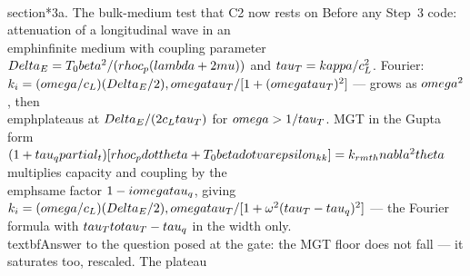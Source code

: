 \documentclass[11pt]{article}
\begin{document}
\\section*{3a. The bulk-medium test that C2 now rests on}
Before any Step~3 code: attenuation of a longitudinal wave in an \\emph{infinite} medium with coupling
parameter $\\Delta_E=T_0\\beta^2/(\\rho c_p(\\lambda+2\\mu))$ and $\\tau_T=\\kappa/c_L^2$.
Fourier: $k_i=(\\omega/c_L)(\\Delta_E/2)\\,\\omega\\tau_T/[1+(\\omega\\tau_T)^2]$ --- grows as $\\omega^2$,
then \\emph{plateaus} at $\\Delta_E/(2c_L\\tau_T)$ for $\\omega>1/\\tau_T$.
MGT in the Gupta form $(1+\\tau_q\\partial_t)[\\rho c_p\\dot\\theta+T_0\\beta\\dot\\varepsilon_{kk}]
=k_{\\rm th}\\nabla^2\\theta$ multiplies capacity and coupling by the \\emph{same} factor
$1-i\\omega\\tau_q$, giving $k_i=(\\omega/c_L)(\\Delta_E/2)\\,\\omega\\tau_T/[1+\omega^2(\\tau_T-\\tau_q)^2]$
--- the Fourier formula with $\\tau_T\\to\\tau_T-\\tau_q$ in the width only. \\textbf{Answer to the
question posed at the gate: the MGT floor does not fall --- it saturates too, rescaled.} The plateau
\end{document}

